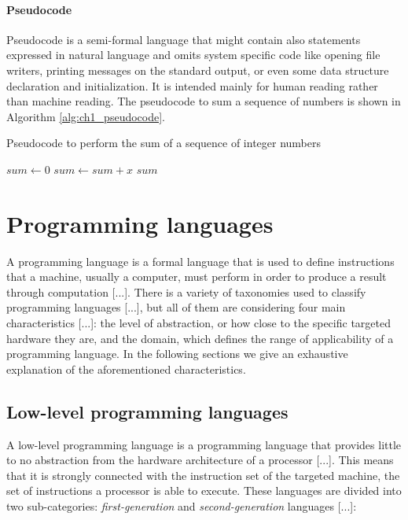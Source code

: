 \paragraph{Pseudocode}
Pseudocode is a semi-formal language that might contain also statements expressed in natural language and omits system specific code like opening file writers, printing messages on the standard output, or even some data structure declaration and initialization. It is intended mainly for human reading rather than machine reading. The pseudocode to sum a sequence of numbers is shown in Algorithm \ref{alg:ch1_pseudocode}.

\begin{algorithm}
	\caption{Pseudocode to perform the sum of a sequence of integer numbers}
	\label{alg:ch1_pseudocode}
	\begin{algorithmic}
			\State $sum \gets 0$
				\State $sum \gets sum + x$
			\EndFor
			\State \Return $sum$
		\EndFunction
	\end{algorithmic}
\end{algorithm}


\section{Programming languages}
A programming language is a formal language that is used to define instructions that a machine, usually a computer, must perform in order to produce a result through computation [...]. There is a variety of taxonomies used to classify programming languages [...], but all of them are considering four main characteristics [...]: the level of abstraction, or how close to the specific targeted hardware they are, and the domain, which defines the range of applicability of a programming language. In the following sections we give an exhaustive explanation of the aforementioned characteristics.

\subsection{Low-level programming languages}
A low-level programming language is a programming language that provides little to no abstraction from the hardware architecture of a processor [...]. This means that it is strongly connected with the instruction set of the targeted machine, the set of instructions a processor is able to execute. These languages are divided into two sub-categories: \textit{first-generation} and \textit{second-generation} languages [...]:

